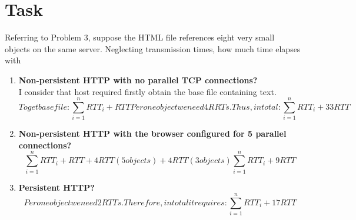 \documentclass[11pt]{article}
\begin{document}
    \section{Task}\label{sec:task_4}
    Referring to Problem 3, suppose the HTML file references eight very small objects on the same server.
    Neglecting transmission times, how much time elapses with
    \begin{enumerate}[label=(\alph*)]
        \item \textbf{Non-persistent HTTP with no parallel TCP connections?} \\
        I consider that host required firstly obtain the base file containing text.
        \begin{subequations}
            To get base file:
            \begin{equation}
                \sum_{i=1}^{n} RTT_{i} + RTT
            \end{equation}
            Per one object we need 4RRTs.
            Thus, in total:
            \begin{equation}
                \sum_{i=1}^{n} RTT_{i} + 33RTT
            \end{equation}
        \end{subequations}
        \item \textbf{Non-persistent HTTP with the browser configured for 5 parallel connections?} \\
        \begin{subequations}
            \begin{equation}
                \sum_{i=1}^{n} RTT_{i} + RTT + 4RTT(5 objects) + 4RTT(3 objects)
            \end{equation}
            \begin{equation}
                \sum_{i=1}^{n} RTT_{i} + 9RTT
            \end{equation}
        \end{subequations}
        \item \textbf{Persistent HTTP?} \\
        \begin{subequations}
            Per one object we need 2RTTs. Therefore, in total it requires:
            \begin{equation}
                \sum_{i=1}^{n} RTT_{i} + 17RTT
            \end{equation}
        \end{subequations}
    \end{enumerate}
\end{document}
